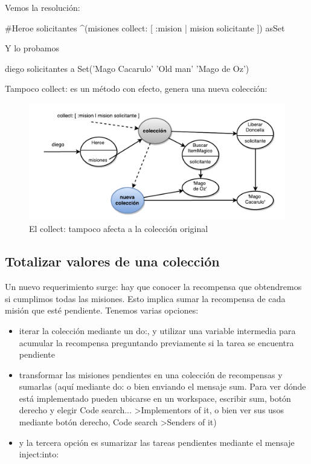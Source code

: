 \documentclass[a4paper,12pt]{book}
\begin{document}
Vemos la resolución:

\begin{code}
#Heroe
solicitantes
   ^(misiones collect: [ :mision | mision solicitante ]) asSet
\end{code}

Y lo probamos 

\begin{code}
diego solicitantes
   a Set('Mago Cacarulo' 'Old man' 'Mago de Oz')
\end{code}

Tampoco collect: es un método con efecto, genera una nueva colección:

\begin{figure}[h!]
    \centering
    \includegraphics[width=1.1\textwidth]{images/21_Collect_sin_efecto.pdf}
    \caption{El collect: tampoco afecta a la colección original}
\end{figure}


\subsection{Totalizar valores de una colección}
Un nuevo requerimiento surge: hay que conocer la recompensa que obtendremos si cumplimos todas las misiones.
Esto implica sumar la recompensa de cada misión que esté pendiente. Tenemos varias opciones:
\\
\begin{itemize}
 \item iterar la colección mediante un do:, y utilizar una variable intermedia para acumular la recompensa
 preguntando previamente si la tarea se encuentra pendiente
 \item transformar las misiones pendientes en una colección de recompensas y sumarlas (aquí mediante do: o 
 bien enviando el mensaje sum. Para ver dónde está implementado pueden ubicarse en un workspace, escribir sum, 
 botón derecho y elegir Code search... \textgreater Implementors of it, o bien ver sus usos mediante botón derecho,
 Code search \textgreater Senders of it)
 \item y la tercera opción es sumarizar las tareas pendientes mediante el mensaje inject:into:
\end{itemize}
\end{document}
